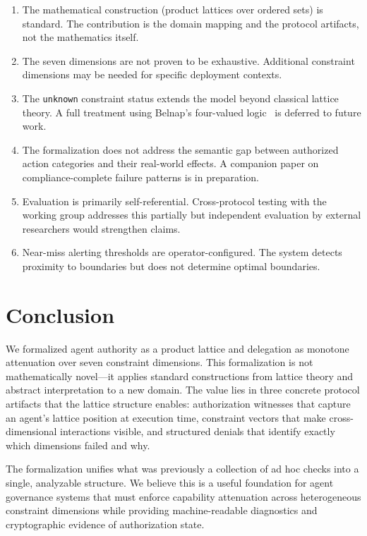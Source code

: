\documentclass[sigconf,nonacm]{acmart}
\begin{document}
\begin{enumerate}
\item The mathematical construction (product lattices over ordered sets) is standard.
      The contribution is the domain mapping and the protocol artifacts, not the
      mathematics itself.
\item The seven dimensions are not proven to be exhaustive. Additional constraint
      dimensions may be needed for specific deployment contexts.
\item The \texttt{unknown} constraint status extends the model beyond classical
      lattice theory. A full treatment using Belnap's four-valued logic~\cite{belnap1977}
      is deferred to future work.
\item The formalization does not address the semantic gap between authorized
      action categories and their real-world effects. A companion paper on
      compliance-complete failure patterns is in preparation.
\item Evaluation is primarily self-referential. Cross-protocol testing with the
      working group addresses this partially but independent evaluation by
      external researchers would strengthen claims.
\item Near-miss alerting thresholds are operator-configured. The system detects
      proximity to boundaries but does not determine optimal boundaries.
\end{enumerate}

\section{Conclusion}

We formalized agent authority as a product lattice and delegation as monotone attenuation
over seven constraint dimensions. This formalization is not mathematically novel---it
applies standard constructions from lattice theory and abstract interpretation to a
new domain. The value lies in three concrete protocol artifacts that the lattice
structure enables: authorization witnesses that capture an agent's lattice position at
execution time, constraint vectors that make cross-dimensional interactions visible,
and structured denials that identify exactly which dimensions failed and why.

The formalization unifies what was previously a collection of ad hoc checks into a
single, analyzable structure. We believe this is a useful foundation for agent governance
systems that must enforce capability attenuation across heterogeneous constraint
dimensions while providing machine-readable diagnostics and cryptographic evidence
of authorization state.
\end{document}
